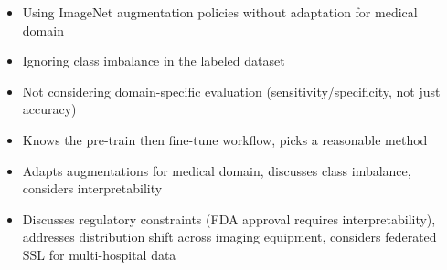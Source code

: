 \begin{interviewq}
\redflags
\begin{itemize}
    \item Using ImageNet augmentation policies without adaptation for medical domain
    \item Ignoring class imbalance in the labeled dataset
    \item Not considering domain-specific evaluation (sensitivity/specificity, not just accuracy)
\end{itemize}


\goodgreat
\begin{itemize}
    \item {} Knows the pre-train then fine-tune workflow, picks a reasonable method
    \item {} Adapts augmentations for medical domain, discusses class imbalance, considers interpretability
    \item {} Discusses regulatory constraints (FDA approval requires interpretability), addresses distribution shift across imaging equipment, considers federated SSL for multi-hospital data
\end{itemize}

\end{interviewq}

